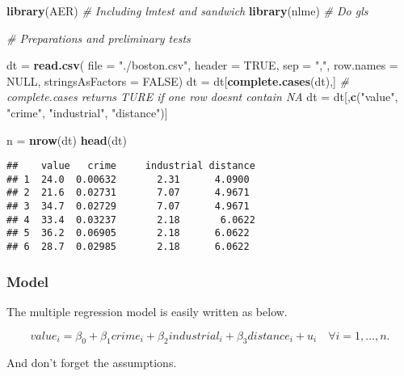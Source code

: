 \documentclass[
  12pt,
]{article}
\newenvironment{Shaded}{\begin{snugshade}}{\end{snugshade}}
\newcommand{\CommentTok}[1]{\textcolor[rgb]{0.56,0.35,0.01}{\textit{#1}}}
\newcommand{\DataTypeTok}[1]{\textcolor[rgb]{0.13,0.29,0.53}{#1}}
\newcommand{\KeywordTok}[1]{\textcolor[rgb]{0.13,0.29,0.53}{\textbf{#1}}}
\newcommand{\NormalTok}[1]{#1}
\newcommand{\OtherTok}[1]{\textcolor[rgb]{0.56,0.35,0.01}{#1}}
\newcommand{\StringTok}[1]{\textcolor[rgb]{0.31,0.60,0.02}{#1}}
\begin{document}
\begin{Shaded}
\begin{Highlighting}[]
\KeywordTok{library}\NormalTok{(AER) }\CommentTok{\# Including lmtest and sandwich}
\KeywordTok{library}\NormalTok{(nlme) }\CommentTok{\# Do gls}

\CommentTok{\# Preparations and preliminary tests}

\NormalTok{dt =}\StringTok{ }\KeywordTok{read.csv}\NormalTok{(}
\DataTypeTok{file =} \StringTok{"./boston.csv"}\NormalTok{,}
\DataTypeTok{header =} \OtherTok{TRUE}\NormalTok{, }\DataTypeTok{sep =} \StringTok{","}\NormalTok{, }\DataTypeTok{row.names =} \OtherTok{NULL}\NormalTok{, }\DataTypeTok{stringsAsFactors =} \OtherTok{FALSE}\NormalTok{)}
\NormalTok{dt =}\StringTok{ }\NormalTok{dt[}\KeywordTok{complete.cases}\NormalTok{(dt),] }\CommentTok{\# complete.cases returns TURE if one row doesn\textquotesingle{}t contain NA}
\NormalTok{dt =}\StringTok{ }\NormalTok{dt[,}\KeywordTok{c}\NormalTok{(}\StringTok{"value"}\NormalTok{, }\StringTok{"crime"}\NormalTok{, }\StringTok{"industrial"}\NormalTok{, }\StringTok{"distance"}\NormalTok{)]}

\NormalTok{n =}\StringTok{ }\KeywordTok{nrow}\NormalTok{(dt)}
\KeywordTok{head}\NormalTok{(dt)}
\end{Highlighting}
\end{Shaded}

\begin{verbatim}
##    value   crime     industrial distance
## 1  24.0  0.00632       2.31      4.0900
## 2  21.6  0.02731       7.07      4.9671
## 3  34.7  0.02729       7.07      4.9671
## 4  33.4  0.03237       2.18       6.0622
## 5  36.2  0.06905       2.18      6.0622
## 6  28.7  0.02985       2.18      6.0622
\end{verbatim}

\hypertarget{model-5}{%
\subsubsection{Model}\label{model-5}}

The multiple regression model is easily written as below.

\[
value_i = \beta_0 + \beta_1 crime_i + \beta_2 industrial_i + \beta_3 distance_i + u_i \quad \forall i = 1, \dots, n.
\]

And don't forget the assumptions.
\end{document}
